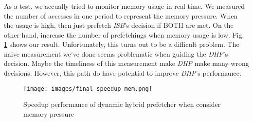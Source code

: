 \subsubsection*{}
\subsubsection*{}
As a test, we accually tried to monitor memory usage in real time. We measured the number of accesses in one period to represent the memory pressure. When the usage is high, then just prefetch \emph{ISB}'s decision if BOTH are met. On the other hand, increase the number of prefetchings when memory usage is low. Fig. \ref{fig:final_speedup_mem} shows our result. Unfortunately, this turns out to be a difficult problem. The naive measurement we've done seems problematic when guiding the \emph{DHP}'s decision. Maybe the timeliness of this measurement make \emph{DHP} make many wrong decisions. However, this path do have potential to improve \emph{DHP}'s performance.

\begin{figure}[ht!]
   \centering
   \texttt{[image: images/final\_speedup\_mem.png]}
   \caption{Speedup performance of dynamic hybrid prefetcher when consider memory pressure}
   \label{fig:final_speedup_mem}
\end{figure}
